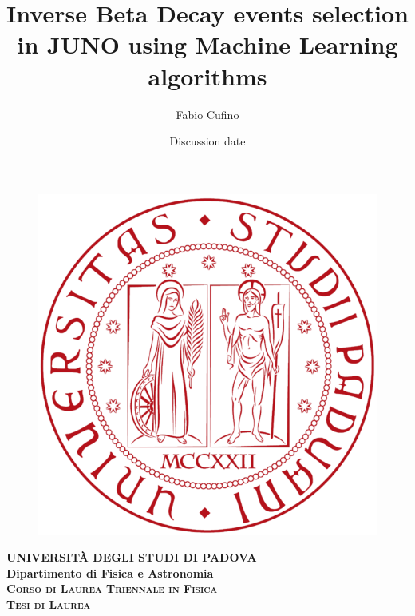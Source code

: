 \documentclass[a4paper,12pt]{memoir} %
\title{Inverse Beta Decay events selection in JUNO using Machine Learning algorithms}
\author{Fabio Cufino}
\date{Discussion date}
\begin{document}
  \frontmatter
  \begin{titlingpage} %
    \vspace{5mm}
    \begin{figure}[ht]
      \centering
      \includegraphics[scale=.13]{Images/logo.png}
    \end{figure}
    \vspace{5mm}
    \begin{center}
      {{\Large{\textsc{\textbf{UNIVERSITÀ DEGLI STUDI DI PADOVA}}}}\\}
      \vspace{5mm}
      {\textbf{Dipartimento di Fisica e Astronomia}} \\ %
      \vspace{5mm}
      {\textsc{\textbf{Corso di Laurea Triennale in Fisica}}}\\ %
      \vspace{20mm}
      {\textsc{\textbf{Tesi di Laurea}}}\\ %
      \vspace{25mm}
      \begin{Spacing}{3}
        {\Large \textbf{\thetitle}}\\
      \end{Spacing}
      \vspace{8mm}
    \end{center}


\end{titlingpage}
\end{document}
